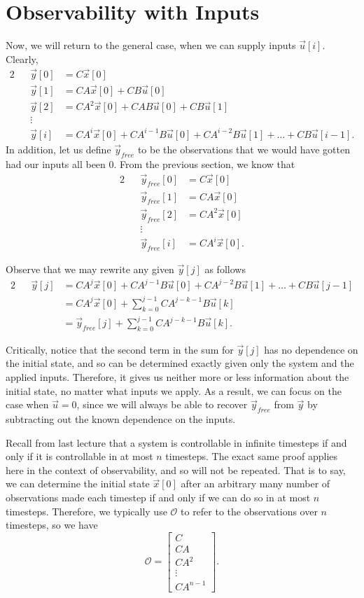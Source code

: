 \documentclass[letterpaper]{article}
\theoremstyle{remark}
\newcommand{\mat}[1]{\ensuremath{\begin{bmatrix}#1\end{bmatrix}}}
\newcommand{\eqn}[1]{\begin{alignat*}{2}#1\end{alignat*}}
\begin{document}
\section{Observability with Inputs}
Now, we will return to the general case, when we can supply inputs $\vec{u}[i]$. Clearly,
\eqn{
    && \vec{y}[0] &= C\vec{x}[0] \\
    && \vec{y}[1] &= CA\vec{x}[0] + CB\vec{u}[0] \\
    && \vec{y}[2] &= CA^2\vec{x}[0] + CAB\vec{u}[0] + CB\vec{u}[1] \\
    && \vdots \\
    && \vec{y}[i] &= CA^i\vec{x}[0] + CA^{i-1}B\vec{u}[0] + CA^{i - 2}B\vec{u}[1] + \ldots + CB\vec{u}[i-1].
}
In addition, let us define $\vec{y}_{free}$ to be the observations that we would have gotten had our inputs all been $0$. From the previous section, we know that
\eqn{
    && \vec{y}_{free}[0] &= C\vec{x}[0] \\
    && \vec{y}_{free}[1] &= CA\vec{x}[0] \\
    && \vec{y}_{free}[2] &= CA^2\vec{x}[0] \\
    && \vdots \\
    && \vec{y}_{free}[i] &= CA^i\vec{x}[0].
}

Observe that we may rewrite any given $\vec{y}[j]$ as follows
\eqn{
    && \vec{y}[j] &= CA^j\vec{x}[0] + CA^{j-1}B\vec{u}[0] + CA^{j-2}B\vec{u}[1] + \ldots + CB\vec{u}[j-1] \\
    &&&= CA^j\vec{x}[0] + \sum_{k=0}^{j-1} CA^{j - k - 1}B\vec{u}[k] \\
    &&&= \vec{y}_{free}[j] + \sum_{k=0}^{j-1} CA^{j - k - 1}B\vec{u}[k].
}

Critically, notice that the second term in the sum for $\vec{y}[j]$ has no dependence on the initial state, and so can be determined exactly given only the system and the applied inputs. Therefore, it gives us neither more or less information about the initial state, no matter what inputs we apply. As a result, we can focus on the case when $\vec{u} = 0$, since we will always be able to recover $\vec{y}_{free}$ from $\vec{y}$ by subtracting out the known dependence on the inputs.

Recall from last lecture that a system is controllable in infinite timesteps if and only if it is controllable in at most $n$ timesteps. The exact same proof applies here in the context of observability, and so will not be repeated. That is to say, we can determine the initial state $\vec{x}[0]$ after an arbitrary many number of observations made each timestep if and only if we can do so in at most $n$ timesteps. Therefore, we typically use $\mathscr{O}$ to refer to the observations over $n$ timesteps, so we have
\[
    \mathscr{O} = \mat{C \\ CA \\ CA^2 \\ \vdots \\ CA^{n - 1}}.
\]
\end{document}
